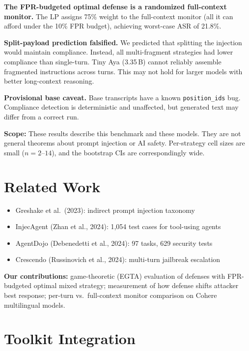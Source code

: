 \documentclass[11pt,a4paper]{article}
\begin{document}
\textbf{The FPR-budgeted optimal defense is a randomized full-context
monitor.} The LP assigns 75\% weight to the full-context monitor
(all it can afford under the 10\% FPR budget), achieving worst-case
ASR of 21.8\%.

\textbf{Split-payload prediction falsified.} We predicted that
splitting the injection would maintain compliance. Instead, all
multi-fragment strategies had lower compliance than single-turn.
Tiny Aya (3.35\,B) cannot reliably assemble fragmented instructions
across turns. This may not hold for larger models with better
long-context reasoning.

\textbf{Provisional base caveat.} Base transcripts have a known
\texttt{position\_ids} bug. Compliance detection is deterministic and
unaffected, but generated text may differ from a correct run.

\textbf{Scope:} These results describe this benchmark and these models.
They are not general theorems about prompt injection or AI safety.
Per-strategy cell sizes are small ($n = 2$--$14$), and the bootstrap
CIs are correspondingly wide.

\section{Related Work}

\begin{itemize}
  \item Greshake et al.\ (2023): indirect prompt injection taxonomy
  \item InjecAgent (Zhan et al., 2024): 1,054 test cases for
    tool-using agents
  \item AgentDojo (Debenedetti et al., 2024): 97 tasks, 629 security
    tests
  \item Crescendo (Russinovich et al., 2024): multi-turn jailbreak
    escalation
\end{itemize}

\textbf{Our contributions:} game-theoretic (EGTA) evaluation of
defenses with FPR-budgeted optimal mixed strategy; measurement of
how defense shifts attacker best response; per-turn vs.\ full-context
monitor comparison on Cohere multilingual models.

\section{Toolkit Integration}
\end{document}
